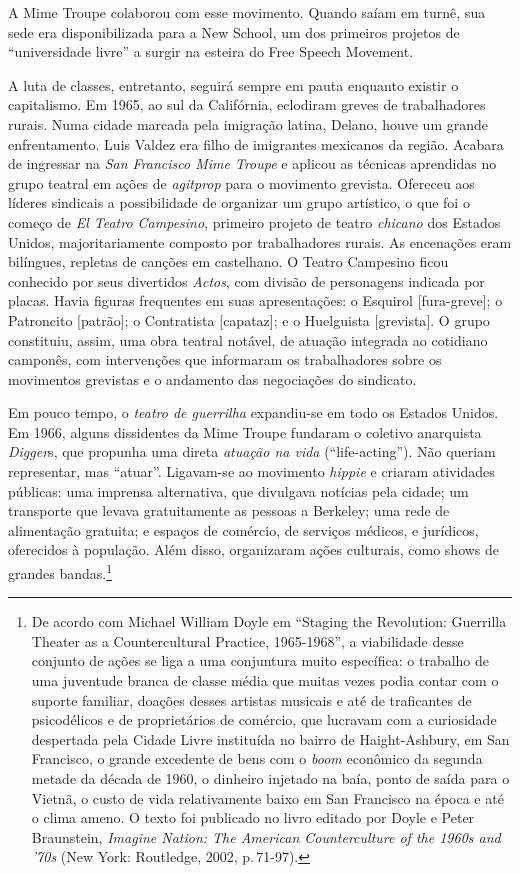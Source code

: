 A Mime Troupe colaborou com esse movimento. Quando saíam em turnê, sua
sede era disponibilizada para a New School, um dos primeiros projetos de
“universidade livre” a surgir na esteira do Free Speech Movement.

A luta de classes, entretanto, seguirá sempre em pauta enquanto existir
o capitalismo. Em 1965, ao sul da Califórnia, eclodiram greves de
trabalhadores rurais. Numa cidade marcada pela imigração latina, Delano,
houve um grande enfrentamento. Luis Valdez era filho de imigrantes
mexicanos da região. Acabara de ingressar na {\it San Francisco Mime
Troupe} e aplicou as técnicas aprendidas no grupo teatral em ações de
{\it agitprop} para o movimento grevista. Ofereceu aos líderes sindicais
a possibilidade de organizar um grupo artístico, o que foi o começo de
{\it El Teatro Campesino}, primeiro projeto de teatro {\it chicano} dos
Estados Unidos, majoritariamente composto por trabalhadores rurais. As
encenações eram bilíngues, repletas de canções em castelhano. O Teatro
Campesino ficou conhecido por seus divertidos {\it Actos}, com divisão
de personagens indicada por placas. Havia figuras frequentes em suas
apresentações: o Esquirol {[}fura-greve{]}; o Patroncito {[}patrão{]}; o
Contratista {[}capataz{]}; e o Huelguista {[}grevista{]}. O grupo
constituiu, assim, uma obra teatral notável, de atuação integrada ao
cotidiano camponês, com intervenções que informaram os trabalhadores
sobre os movimentos grevistas e o andamento das negociações do
sindicato.

Em pouco tempo, o {\it teatro de guerrilha} expandiu-se em todo os
Estados Unidos. Em 1966, alguns dissidentes da Mime Troupe fundaram o
coletivo anarquista {\it Digger}s, que propunha uma direta {\it atuação
na vida} (“life-acting”). Não queriam representar, mas “atuar”.
Ligavam-se ao movimento {\it hippie} e criaram atividades públicas: uma
imprensa alternativa, que divulgava notícias pela cidade; um transporte
que levava gratuitamente as pessoas a Berkeley; uma rede de alimentação
gratuita; e espaços de comércio, de serviços médicos, e jurídicos,
oferecidos à população. Além disso, organizaram ações culturais, como
shows de grandes bandas.\footnote{De acordo com Michael William Doyle em
  “Staging the Revolution: Guerrilla Theater as a Countercultural
  Practice, 1965-1968”, a viabilidade desse conjunto de ações se liga a
  uma conjuntura muito específica: o trabalho de uma juventude branca de
  classe média que muitas vezes podia contar com o suporte familiar,
  doações desses artistas musicais e até de traficantes de psicodélicos
  e de proprietários de comércio, que lucravam com a curiosidade
  despertada pela Cidade Livre instituída no bairro de Haight-Ashbury,
  em San Francisco, o grande excedente de bens com o {\it boom}
  econômico da segunda metade da década de 1960, o dinheiro injetado na
  baía, ponto de saída para o Vietnã, o custo de vida relativamente
  baixo em San Francisco na época e até o clima ameno. O texto foi
  publicado no livro editado por Doyle e Peter Braunstein, {\it Imagine
  Nation: The American Counterculture of the 1960s and '70s} (New York:
  Routledge, 2002, p.\,71-97).}

